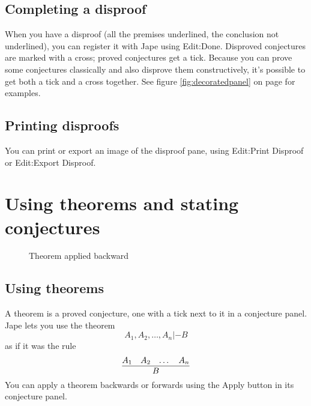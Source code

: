 \documentclass[11pt]{book}
\newcommand{\figref}[1]{figure \ref{fig:#1}}
\begin{document}
\section{Completing a disproof}

When you have a disproof (all the premises underlined, the conclusion not underlined), you can register it with Jape using Edit:Done. Disproved conjectures are marked with a cross; proved conjectures get a tick. Because you can prove some conjectures classically and also disprove them constructively, it's possible to get both a tick and a cross together. See \figref{decoratedpanel} on page \pageref{fig:decoratedpanel} for examples.

\section{Printing disproofs}

You can print or export an image of the disproof pane, using Edit:Print Disproof or Edit:Export Disproof.
 
\chapter{Using theorems and stating conjectures}
\label{chap:theorems}

\begin{figure}
\centering
{}
\qquad
{}
\caption{Theorem applied backward}
\label{fig:theorembackward}
\end{figure}

\section{Using theorems}

A theorem is a proved conjecture, one with a tick next to it in a conjecture panel. Jape lets you use the theorem
\begin{equation*}
A_{1},A_{2},\dots,A_{n}|-B
\end{equation*}
as if it was the rule
\begin{equation*}
\infer{B}
      {A_{1} & A_{2} & \dots & A_{n}}
\end{equation*}
You can apply a theorem backwards  or forwards using the Apply button in its conjecture panel.  
\end{document}

